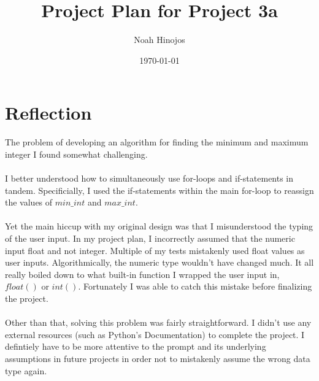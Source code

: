 \documentclass[12pt]{article}
\title{\textbf{Project Plan for Project 3a}}
\author{Noah Hinojos}
\date{\today}
\begin{document}
\maketitle

\section*{Reflection}

The problem of developing an algorithm for finding the minimum and maximum integer I found somewhat challenging. 
\\ \\
I better understood how to simultaneously use for-loops and if-statements in tandem. Specificially, I used the if-statements within the main for-loop to reassign the values of $min\_int$ and $max\_int$.
\\ \\
Yet the main hiccup with my original design was that I misunderstood the typing of the user input. In my project plan, I incorrectly assumed that the numeric input float and not integer. Multiple of my tests mistakenly used float values as user inputs. Algorithmically, the numeric type wouldn't have changed much. It all really boiled down to what built-in function I wrapped the user input in, $float()$ or $int()$. Fortunately I was able to catch this mistake before finalizing the project.
\\ \\
Other than that, solving this problem was fairly straightforward. I didn't  use any external resources (such as Python's Documentation) to complete the project. I defintiely have to be more attentive to the prompt and its underlying assumptions in future projects in order not to mistakenly assume the wrong data type again.
\end{document}
